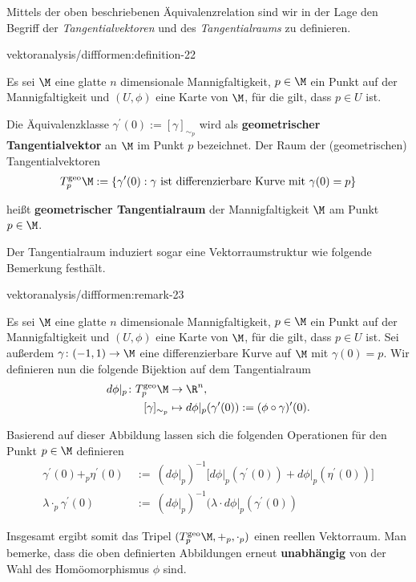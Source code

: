 \documentclass[letterpaper,10pt,english]{jupyterBook}
\begin{document}
\par
Mittels der oben beschriebenen Äquivalenzrelation sind wir in der Lage den Begriff der \emph{Tangentialvektoren} und des \emph{Tangentialraums} zu definieren.
\begin{definition}{}{vektoranalysis/diffformen:definition-22}



\par
Es sei \(\M\) eine glatte \(n\) dimensionale Mannigfaltigkeit, \(p\in\M\) ein Punkt auf der Mannigfaltigkeit und \((U,\phi)\) eine Karte von \(\M\), für die gilt, dass \(p\in U\) ist.

\par
Die Äquivalenzklasse \(\gamma^\prime(0):=[\gamma]_{\sim_p}\) wird als \textbf{geometrischer Tangentialvektor} an \(\M\) im Punkt \(p\) bezeichnet.
Der Raum der (geometrischen) Tangentialvektoren
\begin{align*}
T_p^{\text{geo}}\M := \{\gamma^\prime(0): \gamma\text{ ist differenzierbare Kurve mit }\gamma(0)=p\}
\end{align*}
\par
heißt \textbf{geometrischer Tangentialraum} der Mannigfaltigkeit \(\M\) am Punkt \(p \in \M\).
\end{definition}

\par
Der Tangentialraum induziert sogar eine Vektorraumstruktur wie folgende Bemerkung festhält.
\begin{remark}{}{vektoranalysis/diffformen:remark-23}



\par
Es sei \(\M\) eine glatte \(n\) dimensionale Mannigfaltigkeit, \(p\in\M\) ein Punkt auf der Mannigfaltigkeit und \((U,\phi)\) eine Karte von \(\M\), für die gilt, dass \(p\in U\) ist.
Sei außerdem \(\gamma \colon (-1,1) \rightarrow \M\) eine differenzierbare Kurve auf \(\M\) mit \(\gamma(0) = p\).
Wir definieren nun die folgende Bijektion auf dem Tangentialraum
\begin{align*}
d\phi\rvert_p \colon T^{\text{geo}}_p\M &\rightarrow \R^n,\\
[\gamma]_{\sim_p} &\mapsto d\phi\rvert_p (\gamma^\prime(0)) := (\phi \circ \gamma)^\prime (0).
\end{align*}
\par
Basierend auf dieser Abbildung lassen sich die folgenden Operationen für den Punkt \(p \in \M\) definieren
\begin{align*}
\gamma^\prime(0) +_{p} \eta^\prime(0) \ &:= \
(d\phi\rvert_p)^{-1}\big[d\phi\rvert_p(\gamma^\prime(0)) + d\phi\rvert_p(\eta^\prime(0))\big]\\
\lambda \cdot_p \gamma^\prime(0) \ &:= \ (d\phi\rvert_p)^{-1} (\lambda \cdot d\phi\rvert_p(\gamma^\prime(0))
\end{align*}
\par
Insgesamt ergibt somit das Tripel \((T_p^{\text{geo}}\M, +_p, \cdot_p)\) einen reellen Vektorraum.
Man bemerke, dass die oben definierten Abbildungen erneut \textbf{unabhängig} von der Wahl des Homöomorphismus \(\phi\) sind.
\end{remark}
\end{document}
